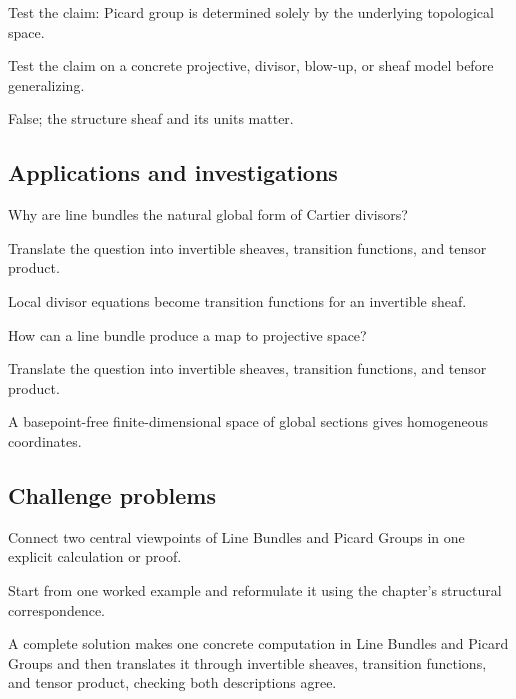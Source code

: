 \begin{exercise}\label{exr:vi42-expand-12}
Test the claim: Picard group is determined solely by the underlying topological space.
\end{exercise}
\begin{hint}
Test the claim on a concrete projective, divisor, blow-up, or sheaf model before generalizing.
\end{hint}
\begin{solution}
False; the structure sheaf and its units matter.
\end{solution}

\subsection*{Applications and investigations}

\begin{exercise}[Divisors]\label{exr:vi42-expand-13}
Why are line bundles the natural global form of Cartier divisors?
\end{exercise}
\begin{hint}
Translate the question into invertible sheaves, transition functions, and tensor product.
\end{hint}
\begin{solution}
Local divisor equations become transition functions for an invertible sheaf.
\end{solution}

\begin{exercise}\label{exr:vi42-expand-14}
How can a line bundle produce a map to projective space?
\end{exercise}
\begin{hint}
Translate the question into invertible sheaves, transition functions, and tensor product.
\end{hint}
\begin{solution}
A basepoint-free finite-dimensional space of global sections gives homogeneous coordinates.
\end{solution}

\subsection*{Challenge problems}

\begin{exercise}\label{exr:vi42-expand-15}
Connect two central viewpoints of Line Bundles and Picard Groups in one explicit calculation or proof.
\end{exercise}
\begin{hint}
Start from one worked example and reformulate it using the chapter's structural correspondence.
\end{hint}
\begin{solution}
A complete solution makes one concrete computation in Line Bundles and Picard Groups and then translates it through invertible sheaves, transition functions, and tensor product, checking both descriptions agree.
\end{solution}

